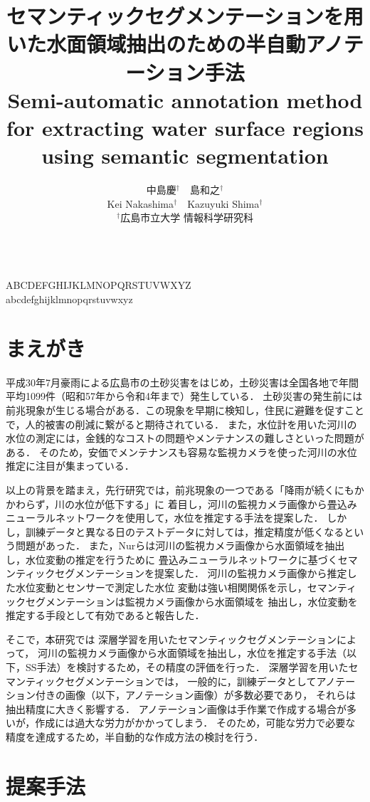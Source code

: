 \documentclass[a4j,twocolumn,10pt]{jarticle}
\title{ 
  セマンティックセグメンテーションを用いた水面領域抽出のための半自動アノテーション手法 \\
  Semi-automatic annotation method for extracting water surface regions using semantic segmentation
}
\author{%
中島慶$^{\dagger}$　島和之$^{\dagger}$ \\
Kei Nakashima$^{\dagger}$　Kazuyuki Shima$^{\dagger}$ \\
$^{\dagger}$広島市立大学 情報科学研究科\hspace*{1em}
}
\begin{document}
\maketitle
\thispagestyle{empty} %
\pagestyle{empty} %
\baselineskip=4.5mm %

{ \\
  ABCDEFGHIJKLMNOPQRSTUVWXYZ \\
  abcdefghijklmnopqrstuvwxyz
}

\section{まえがき}
平成30年7月豪雨による広島市の土砂災害をはじめ，土砂災害は全国各地で年間平均1099件（昭和57年から令和4年まで）発生している\cite{mlit}．
土砂災害の発生前には前兆現象が生じる場合がある．この現象を早期に検知し，住民に避難を促すことで，人的被害の削減に繋がると期待されている．
また，水位計を用いた河川の水位の測定には，金銭的なコストの問題やメンテナンスの難しさといった問題がある．
そのため，安価でメンテナンスも容易な監視カメラを使った河川の水位推定に注目が集まっている．

以上の背景を踏まえ，先行研究\cite{watanabe}では，前兆現象の一つである「降雨が続くにもかかわらず，川の水位が低下する」に
着目し，河川の監視カメラ画像から畳込みニューラルネットワークを使用して，水位を推定する手法を提案した．
しかし，訓練データと異なる日のテストデータに対しては，推定精度が低くなるという問題があった．
また，Nurら\cite{seman}は河川の監視カメラ画像から水面領域を抽出し，水位変動の推定を行うために
畳込みニューラルネットワークに基づくセマンティックセグメンテーションを提案した．
河川の監視カメラ画像から推定した水位変動とセンサーで測定した水位
変動は強い相関関係を示し，セマンティックセグメンテーションは監視カメラ画像から水面領域を
抽出し，水位変動を推定する手段として有効であると報告した．

そこで，本研究では
深層学習を用いたセマンティックセグメンテーションによって，
河川の監視カメラ画像から水面領域を抽出し，水位を推定する手法（以下，SS手法）を検討するため，その精度の評価を行った．
深層学習を用いたセマンティックセグメンテーションでは，
一般的に，訓練データとしてアノテーション付きの画像（以下，アノテーション画像）が多数必要であり，
それらは抽出精度に大きく影響する．
アノテーション画像は手作業で作成する場合が多いが，作成には過大な労力がかかってしまう．
そのため，可能な労力で必要な精度を達成するため，半自動的な作成方法の検討を行う．

\section{提案手法}
\end{document}
